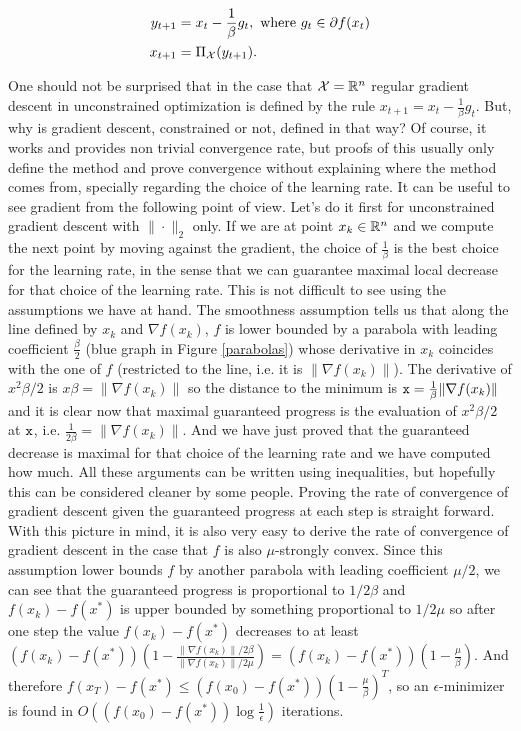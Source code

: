 \begin{align*}
    y_{t+1} &= x_t -\frac{1}{\beta} g_t, \text{ where } g_t \in \partial f(x_t) \\
    x_{t+1} &= \Pi_{\mathcal{X}}(y_{t+1}). \\
\end{align*}

One should not be surprised that in the case that $\mathcal{X} = \mathbb{R}^n$ regular gradient descent in unconstrained optimization is defined by the rule $ x_{t+1} = x_t -\frac{1}{\beta} g_t$. But, why is gradient descent, constrained or not, defined in that way? Of course, it works and provides non trivial convergence rate, but proofs of this usually only define the method and prove convergence without explaining where the method comes from, specially regarding the choice of the learning rate. It can be useful to see gradient from the following point of view. Let's do it first for unconstrained gradient descent with $\|{\cdot}\|_2$ only. If we are at point $x_k \in \mathbb{R}^n$ and we compute the next point by moving against the gradient, the choice of $\frac{1}{\beta}$ is the best choice for the learning rate, in the sense that we can guarantee maximal local decrease for that choice of the learning rate. This is not difficult to see using the assumptions we have at hand. The smoothness assumption tells us that along the line defined by $x_k$ and $\nabla f(x_k)$, $f$ is lower bounded by a parabola with leading coefficient $\frac{\beta}{2}$ (blue graph in Figure \ref{parabolas}) whose derivative in $x_k$ coincides with the one of $f$ (restricted to the line, i.e. it is $\lVert \nabla f(x_k) \rVert$). The derivative of $x^2\beta/2 $ is $x\beta = \lVert \nabla f(x_k) \rVert$ so the distance to the minimum is ${\tt x} = \frac{1}{\beta}\lVert \nabla f(x_k) \rVert$ and it is clear now that maximal guaranteed progress is the evaluation of $x^2\beta/2 $ at $\tt{x}$, i.e. $\frac{1}{2\beta} = \lVert \nabla f(x_k) \rVert$. And we have just proved that the guaranteed decrease is maximal for that choice of the learning rate and we have computed how much. All these arguments can be written using inequalities, but hopefully this can be considered cleaner by some people. %
Proving the rate of convergence of gradient descent given the guaranteed progress at each step is straight forward. With this picture in mind, it is also very easy to derive the rate of convergence of gradient descent in the case that $f$ is also $\mu$-strongly convex. Since this assumption lower bounds $f$ by another parabola with leading coefficient $\mu/2$, we can see that the guaranteed progress is proportional to $1/2\beta$ and $f(x_k) - f(x^\ast)$ is upper bounded by something proportional to $1/2\mu$ so after one step the value $f(x_k)-f(x^\ast)$ decreases to at least $(f(x_k)-f(x^\ast))\left(1 - \frac{\lVert \nabla f(x_k) \rVert/2\beta}{\lVert \nabla f(x_k) \rVert/2\mu}\right) = (f(x_k)-f(x^\ast))\left(1- \frac{\mu}{\beta}\right)$. And therefore $f(x_T)-f(x^\ast) \leq (f(x_0) - f(x^\ast))\left(1- \frac{\mu}{\beta}\right)^T$, so an $\epsilon$-minimizer is found in $O\left((f(x_0) - f(x^\ast))\log \frac{1}{\epsilon}\right)$ iterations.


